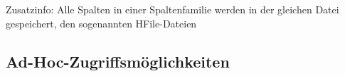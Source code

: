 Zusatzinfo: Alle Spalten in einer Spaltenfamilie werden in der gleichen Datei gespeichert, den sogenannten HFile-Dateien
\subsection{Ad-Hoc-Zugriffsmöglichkeiten}\label{hbase_adhoc}
%
%
%
%

